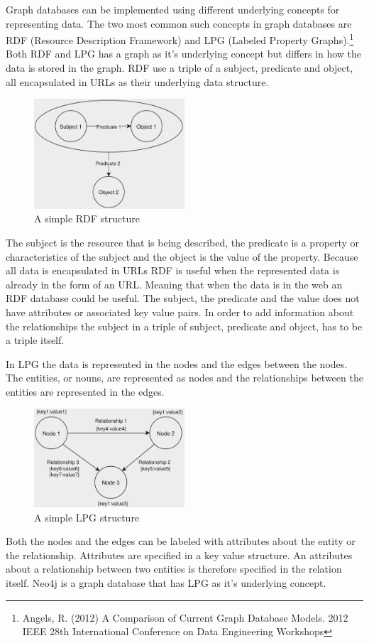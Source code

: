 Graph databases can be implemented using different underlying concepts for representing data. The two most common such concepts in graph databases are RDF (Resource Description Framework) and LPG (Labeled Property Graphs).\footnote{Angels, R. (2012) A Comparison of Current Graph Database Models. 2012 IEEE 28th International Conference on Data Engineering Workshops}
Both RDF and LPG has a graph as it's underlying concept but differs in how the data is stored in the graph. RDF use a triple of a subject, predicate and object, all encapsulated in URLs as their underlying data structure. 
\begin{figure}[h!]
  \centering
  \includegraphics[width=0.5\textwidth]{assets/RDF-example.png}
  \caption{A simple RDF structure}
\end{figure}
The subject is the resource that is being described, the predicate is a property or characteristics of the subject and the object is the value of the property. Because all data is encapsulated in URLs RDF is useful when the represented data is already in the form of an URL. Meaning that when the data is in the web an RDF database could be useful. The subject, the predicate and the value does not have attributes or associated key value pairs. In order to add information about the relationships the subject in a triple of subject, predicate and object, has to be a triple itself. 

In LPG the data is represented in the nodes and the edges between the nodes. The entities, or nouns, are represented as nodes and the relationships between the entities are represented in the edges. 
\begin{figure}[h!]
  \centering
  \includegraphics[width=0.5\textwidth]{assets/LPG-example.png}
  \caption{A simple LPG structure}
\end{figure}
Both the nodes and the edges can be labeled with attributes about the entity or the relationship. Attributes are specified in a key value structure. An attributes about a relationship between two entities is therefore specified in the relation itself. Neo4j is a graph database that has LPG as it's underlying concept.

